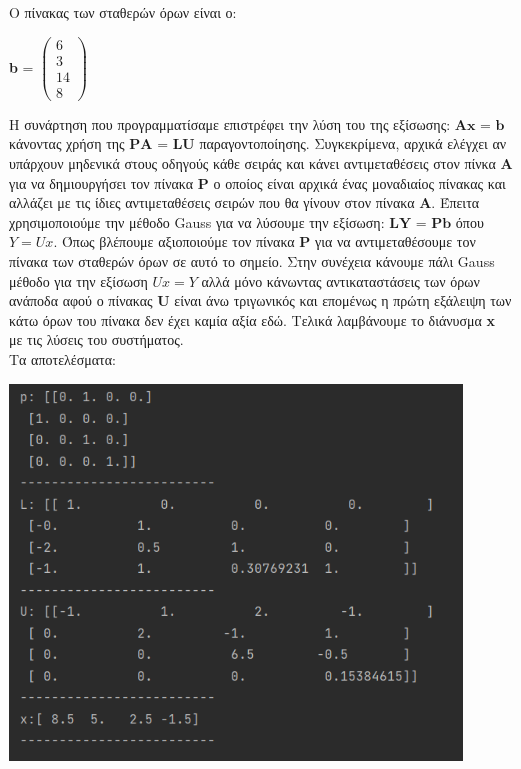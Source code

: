 \documentclass{article}
\begin{document}
Ο πίνακας των σταθερών όρων είναι ο:

\begin{center}
\textbf{b} =
$\begin{pmatrix}
6\\
3\\
14\\
8
\end{pmatrix}$
\end{center}

Η συνάρτηση που προγραμματίσαμε επιστρέφει την λύση του της εξίσωσης: \(\textbf{Ax = b}\) κάνοντας χρήση της \(\textbf{PA = LU}\) παραγοντοποίησης. Συγκεκρίμενα, αρχικά ελέγχει αν υπάρχουν μηδενικά στους οδηγούς κάθε σειράς και κάνει αντιμεταθέσεις στον πίνκα \textbf{A} για να δημιουργήσει τον πίνακα \textbf{P} ο οποίος είναι αρχικά ένας μοναδιαίος πίνακας και αλλάζει με τις ίδιες αντιμεταθέσεις σειρών που θα γίνουν στον πίνακα \textbf{A}. Έπειτα χρησιμοποιούμε την μέθοδο Gauss για να λύσουμε την εξίσωση: \(\textbf{LY = Pb}\) όπου \(Y = Ux\). Όπως βλέπουμε αξιοποιούμε τον πίνακα \textbf{P} για να αντιμεταθέσουμε τον πίνακα των σταθερών όρων σε αυτό το σημείο. Στην συνέχεια κάνουμε πάλι Gauss μέθοδο για την εξίσωση \(Ux = Y\) αλλά μόνο κάνωντας αντικαταστάσεις των όρων ανάποδα αφού ο πίνακας \textbf{U} είναι άνω τριγωνικός και επομένως η πρώτη εξάλειψη των κάτω όρων του πίνακα δεν έχει καμία αξία εδώ. Τελικά λαμβάνουμε το διάνυσμα \textbf{x} με τις λύσεις του συστήματος. \\

Τα αποτελέσματα: 
\begin{center}\includegraphics[width = 12cm, height = 10cm]{images/results_27.png}\end{center}
\end{document}
